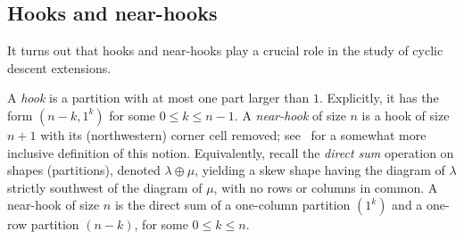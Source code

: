 \subsection{Hooks and near-hooks}\label{sec:near_hooks}

It turns out that hooks and near-hooks play a crucial role in the study of cyclic descent extensions.

A {\em hook} is a partition with at most one part larger than $1$. Explicitly, it has the form $(n-k,1^k)$ for some $0 \le k \le n-1$. 
A {\em near-hook} of size $n$ is a hook of size $n+1$ with its (northwestern) corner cell removed; see~\cite{AER} for a somewhat more inclusive definition of this notion. 
Equivalently, recall the {\em direct sum} operation on shapes (partitions), denoted $\lambda \oplus \mu$, 
yielding a skew shape having the diagram of $\lambda$ strictly southwest of the diagram of $\mu$, with no rows or columns in common.  
A near-hook of size $n$ is the direct sum of a one-column partition $(1^k)$ and a one-row partition $(n-k)$, for some $0 \le k \le n$. 
